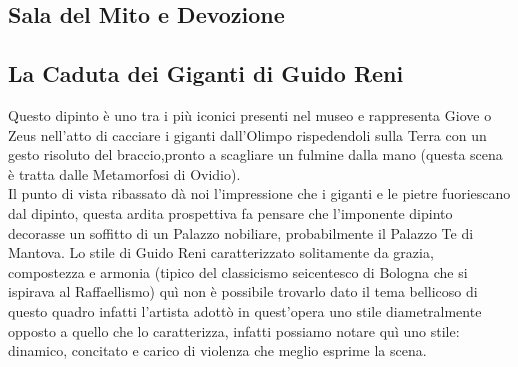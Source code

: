 \documentclass[hidelinks,12pt,a4paper]{article}
\begin{document}
\begin{flushleft}
			\section{Sala del Mito e Devozione}
	
			\subsection{La Caduta dei Giganti di Guido Reni}
			Questo dipinto è uno tra i più iconici presenti nel museo e rappresenta Giove o Zeus nell'atto di cacciare i giganti dall'Olimpo rispedendoli sulla Terra con un gesto risoluto del braccio,pronto a scagliare un fulmine dalla mano (questa scena è tratta dalle Metamorfosi di Ovidio).\\
			Il punto di vista ribassato dà noi l'impressione che i giganti e le pietre fuoriescano dal dipinto, questa ardita prospettiva fa pensare che l'imponente dipinto decorasse un soffitto di un Palazzo nobiliare, probabilmente il Palazzo Te di Mantova. Lo stile di Guido Reni caratterizzato solitamente da grazia, compostezza e armonia (tipico del classicismo seicentesco di Bologna che si ispirava al Raffaellismo) quì non è possibile trovarlo dato il tema bellicoso di questo quadro infatti l'artista adottò in quest'opera uno stile diametralmente opposto a quello che lo caratterizza, infatti possiamo notare quì uno stile: dinamico, concitato e carico di violenza che meglio esprime la scena.
	

\end{flushleft}
\end{document}
